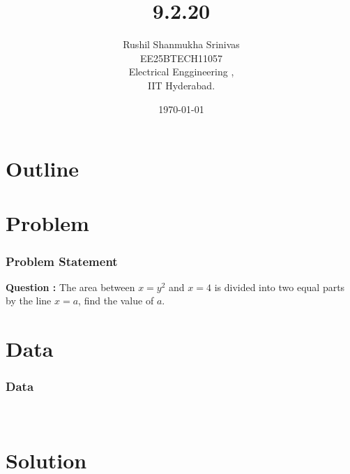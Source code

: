 \documentclass{beamer}
\title{9.2.20}
\author{Rushil Shanmukha Srinivas \\EE25BTECH11057 \\ Electrical Enggineering ,\\IIT Hyderabad.}
\date{\today}
\theoremstyle{remark}
\numberwithin{equation}{section}
\begin{document}
 

\begin{frame}
\titlepage
\end{frame}

\section*{Outline}
\begin{frame}
\tableofcontents
\end{frame}
\section{Problem}
\begin{frame}
\frametitle{Problem Statement}
\textbf{Question :} The area between $x = y^2$ and $x = 4$ is divided into two equal parts by the line $x = a$, find the value of $a$.
\end{frame}
\section{Data}
\begin{frame}
\frametitle{Data}
\\ \begin{table}[h!]    
  \centering
  
  \caption{Parabola and Lines}
\end{table}
\end{frame}
\section{Solution}
\end{document}
